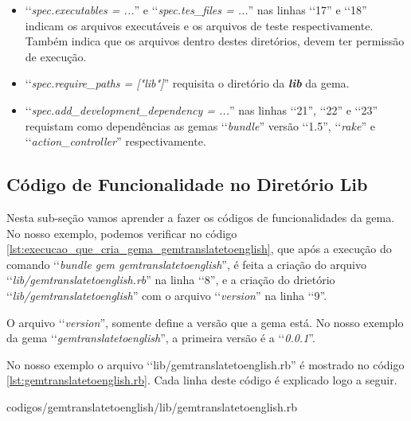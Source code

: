 \begin{itemize}
 \item ‘‘\emph{spec.executables = ...}'' e ‘‘\emph{spec.tes\_files = ...}'' nas linhas ‘‘17'' e ‘‘18''
 indicam os arquivos executáveis e os arquivos de teste respectivamente. Também indica que os arquivos dentro
 destes diretórios, devem ter permissão de execução.

 \item ‘‘\emph{spec.require\_paths = ["lib"]}'' requisita o diretório da \emph{\textbf{lib}} da gema.

 \item ‘‘\emph{spec.add\_development\_dependency = ...}'' nas linhas ‘‘21'', ‘‘22'' e ‘‘23'' requistam como
 dependências as gemas ‘‘\emph{bundle}'' versão ‘‘1.5'', ‘‘\emph{rake}'' e ‘‘\emph{action\_controller}''
 respectivamente.

\end{itemize}


\subsection{Código de Funcionalidade no Diretório Lib}
\label{subsection:codigo_de_funcionalidade_no_diretorio_lib}


Nesta sub-seção vamos aprender a fazer os códigos de funcionalidades da gema. No nosso exemplo,
podemos verificar no código \ref{lst:execucao_que_cria_gema_gemtranslatetoenglish}, que após a
execução do comando ‘‘\emph{bundle gem gemtranslatetoenglish}'', é feita a criação do arquivo
‘‘\emph{lib/gemtranslatetoenglish.rb}'' na linha ‘‘8'', e a criação do drietório
‘‘\emph{lib/gemtranslatetoenglish}'' com o arquivo ‘‘\emph{version}'' na linha ‘‘9''.

O arquivo ‘‘\emph{version}'', somente define a versão que a gema está. No nosso exemplo da gema
‘‘\emph{gemtranslatetoenglish}'', a primeira versão é a ‘‘\emph{0.0.1}''.

No nosso exemplo o arquivo ‘‘lib/gemtranslatetoenglish.rb'' é mostrado no código
\ref{lst:gemtranslatetoenglish.rb}. Cada linha deste código é explicado logo a seguir.


{codigos/gemtranslatetoenglish/lib/gemtranslatetoenglish.rb}

